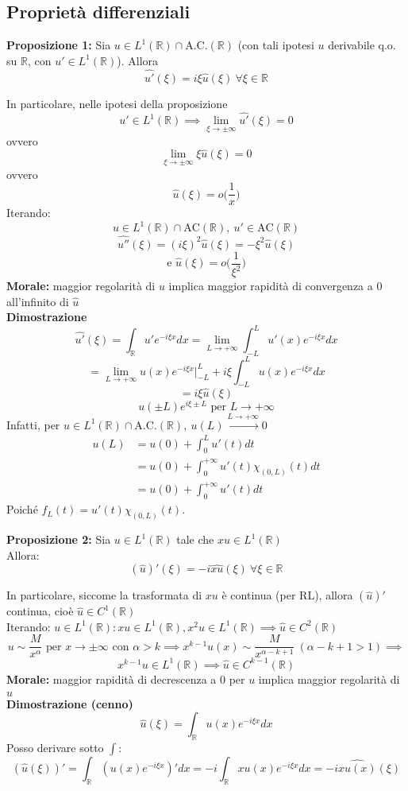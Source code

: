 \documentclass[a4paper]{article}
\newcommand{\R}{\mathbb{R}}
\begin{document}
\subsection{Proprietà differenziali}
\begin{tcolorbox}
	\textbf{Proposizione 1:} Sia $u\in L^{1}(\R)\cap \text{A.C.}(\R)$ (con tali ipotesi $u$ derivabile q.o. su $\R$, con $u'\in L^{1}(\R)$). Allora
	\[\widehat{u'}(\xi)=i\xi \hat{u}(\xi) \ \forall \xi \in \R\]
\end{tcolorbox}
	In particolare, nelle ipotesi della proposizione
	\[u'\in L^{1}(\R)\implies \lim_{\xi \to \pm \infty} \widehat{u'}(\xi)=0\]
	ovvero 
	\[\lim_{\xi \to \pm \infty} \xi \hat{u}(\xi)=0\]
	ovvero
	\[\hat{u}(\xi)=o \bigg(\frac{1}{x}\bigg)\]
	Iterando:\[u\in L^{1}(\R)\cap \text{AC}(\R), \ u'\in \text{AC}(\R)\]
	\[\widehat{u''}(\xi)=(i\xi)^2\hat{u}(\xi)=-\xi^2\hat{u}(\xi)\]
	\[\text{e }\hat{u}(\xi)=o\bigg(\frac{1}{\xi^2}\bigg)\]
\textbf{Morale:} maggior regolarità di $u$ implica maggior rapidità di convergenza a 0 all'infinito di $\hat{u}$ 
\\\textbf{Dimostrazione} 
\[\hat{u'}(\xi)=\int_{\R}^{} u'e^{-i\xi x}dx=\lim_{L \to +\infty} \int_{-L}^{L} u'(x)e^{-i\xi x}dx\]
\[=\lim_{L \to +\infty} u(x)e^{-i\xi x}\biggr\rvert_{-L}^L+i\xi\int_{-L}^{L} u(x)e^{-i\xi x}dx\] 
\[=i\xi \hat{u}(\xi)\]
\[u(\pm L)e^{i\xi \pm L}\text{ per }L\to +\infty\]
Infatti, per $u\in L^{1}(\R)\cap \text{A.C.}(\R),\ u(L)\xrightarrow{L\to +\infty}0$
\begin{equation*}\begin{align*}u(L)&=u(0)+\int_{0}^{L} u'(t)dt
\\&=u(0)+\int_{0}^{+\infty} u'(t)\chi_{(0,L)}(t)dt
\\&=u(0)+\int_{0}^{+\infty} u'(t)dt 
\end{align*}\end{equation*}
Poiché $f_L(t)=u'(t)\chi_{(0,L)}(t)$.
\begin{tcolorbox}
\textbf{Proposizione 2: }Sia $u\in L^{1}(\R)$ tale che $xu\in L^{1}(\R)$ 
\\Allora:
\[(\hat{u})'(\xi)=-i \widehat{xu}(\xi)\ \forall \xi \in \R\]
\end{tcolorbox}
In particolare, siccome la trasformata di $xu$ è continua (per RL), allora $(\hat{u})'$ continua, cioè $\hat{u}\in C^1(\R)$ 
\\Iterando: $u\in L^{1}(\R):xu\in L^{1}(\R), x^2u\in L^{1}(\R)\implies \hat{u}\in C^2(\R)$ 
\[u\sim \frac{M}{x^\alpha}\text{ per }x\to \pm \infty\text{ con }\alpha>k\implies x^{k-1}u(x)\sim \frac{M}{x^{\alpha-k+1}}\ (\alpha -k+1>1)\implies \]
\[x^{k-1}u\in L^{1}(\R)\implies \hat{u}\in C^{k-1}(\R)\]
\textbf{Morale:} maggior rapidità di decrescenza a 0 per $u$ implica maggior regolarità di $\hat{u}$ 
\\\textbf{Dimostrazione (cenno)}
\[\hat{u}(\xi)=\int_{\R}^{} u(x)e^{-i\xi x}dx\]
Posso derivare sotto $\int$:
\[(\hat{u}(\xi))'=\int_{\R}^{} (u(x)e^{-i\xi x})'dx =-i \int_{\R}^{} xu(x)e ^{-i\xi x}dx=-i \widehat{xu(x)}(\xi)\] 
\end{document}
